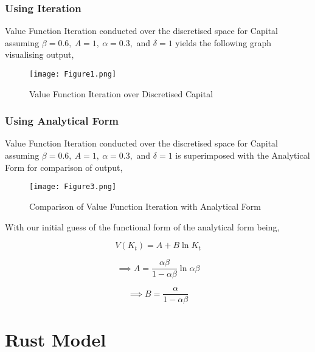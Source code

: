 \documentclass{article}
\begin{document}
\subsubsection{Using Iteration}

Value Function Iteration conducted over the discretised space for Capital assuming $\beta=0.6, \ A=1, \ \alpha=0.3,$ and $\delta=1$ yields the following graph visualising output,

\begin{figure}[h]
\begin{center}
\texttt{[image: Figure1.png]}
\caption{Value Function Iteration over Discretised Capital}
\end{center}
\end{figure}
\FloatBarrier

\newpage

\subsubsection{Using Analytical Form}

Value Function Iteration conducted over the discretised space for Capital assuming $\beta=0.6, \ A=1, \ \alpha=0.3,$ and $\delta=1$ is superimposed with the Analytical Form for comparison of output,

\begin{figure}[h]
\begin{center}
\texttt{[image: Figure3.png]}
\caption{Comparison of Value Function Iteration with Analytical Form}
\end{center}
\end{figure}
\FloatBarrier

With our initial guess of the functional form of the analytical form being,

\begin{equation}
V(K_t) = A + B \ln K_t
\end{equation}

\begin{equation}
\implies A = \frac{\alpha \beta}{1- \alpha \beta} \ln \alpha \beta
\end{equation}

\begin{equation}
\implies B=\frac{\alpha}{1-\alpha\beta}
\end{equation}

\newpage

\section{Rust Model}
\end{document}
